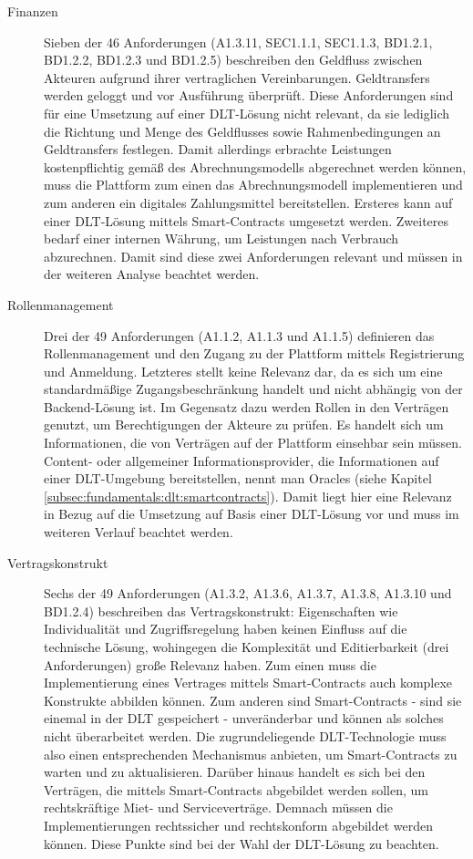 \begin{description}
  \item[Finanzen] Sieben der 46 Anforderungen (A1.3.11, SEC1.1.1, SEC1.1.3, BD1.2.1, BD1.2.2, BD1.2.3 und BD1.2.5) beschreiben den Geldfluss zwischen Akteuren aufgrund ihrer vertraglichen Vereinbarungen. Geldtransfers werden geloggt und vor Ausführung überprüft. Diese Anforderungen sind für eine Umsetzung auf einer \ac{DLT}-Lösung nicht relevant, da sie lediglich die Richtung und Menge des Geldflusses sowie Rahmenbedingungen an Geldtransfers festlegen. Damit allerdings erbrachte Leistungen kostenpflichtig gemäß des Abrechnungsmodells abgerechnet werden können, muss die Plattform zum einen das Abrechnungsmodell implementieren und zum anderen ein digitales Zahlungsmittel bereitstellen. Ersteres kann auf einer \ac{DLT}-Lösung mittels Smart-Contracts umgesetzt werden. Zweiteres bedarf einer internen Währung, um Leistungen nach Verbrauch abzurechnen. Damit sind diese zwei Anforderungen relevant und müssen in der weiteren Analyse beachtet werden.
  \item[Rollenmanagement] Drei der 49 Anforderungen (A1.1.2, A1.1.3 und A1.1.5) definieren das Rollenmanagement und den Zugang zu der Plattform mittels Registrierung und Anmeldung. Letzteres stellt keine Relevanz dar, da es sich um eine standardmäßige Zugangsbeschränkung handelt und nicht abhängig von der Backend-Lösung ist. Im Gegensatz dazu werden Rollen in den Verträgen genutzt, um Berechtigungen der Akteure zu prüfen. Es handelt sich um Informationen, die von Verträgen auf der Plattform einsehbar sein müssen. Content- oder allgemeiner Informationsprovider, die Informationen auf einer \ac{DLT}-Umgebung bereitstellen, nennt man Oracles (siehe Kapitel \ref{subsec:fundamentals:dlt:smartcontracts}). Damit liegt hier eine Relevanz in Bezug auf die Umsetzung auf Basis einer \ac{DLT}-Lösung vor und muss im weiteren Verlauf beachtet werden.
  \item[Vertragskonstrukt] Sechs der 49 Anforderungen (A1.3.2, A1.3.6, A1.3.7, A1.3.8, A1.3.10 und BD1.2.4) beschreiben das Vertragskonstrukt: Eigenschaften wie Individualität und Zugriffsregelung haben keinen Einfluss auf die technische Lösung, wohingegen die Komplexität und Editierbarkeit (drei Anforderungen) große Relevanz haben. Zum einen muss die Implementierung eines Vertrages mittels Smart-Contracts auch komplexe Konstrukte abbilden können. Zum anderen sind Smart-Contracts - sind sie einemal in der \ac{DLT} gespeichert - unveränderbar und können als solches nicht überarbeitet werden. Die zugrundeliegende \ac{DLT}-Technologie muss also einen entsprechenden Mechanismus anbieten, um Smart-Contracts zu warten und zu aktualisieren. Darüber hinaus handelt es sich bei den Verträgen, die mittels Smart-Contracts abgebildet werden sollen, um rechtskräftige Miet- und Serviceverträge. Demnach müssen die Implementierungen rechtssicher und rechtskonform abgebildet werden können. Diese Punkte sind bei der Wahl der \ac{DLT}-Lösung zu beachten.
\end{description}


